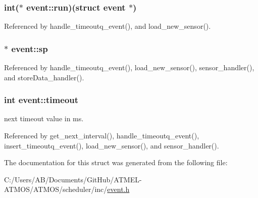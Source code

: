 \hypertarget{structevent_add5b35b1741734964a494b100224aaea}{
\subsubsection[{run}]{\setlength{\rightskip}{0pt plus 5cm}int($\ast$  event\-::run)(struct {\bf event} $\ast$)}}\label{structevent_add5b35b1741734964a494b100224aaea}


Referenced by handle\-\_\-timeoutq\-\_\-event(), and load\-\_\-new\-\_\-sensor().

\hypertarget{structevent_a64304637019072f9322aef7ecf4a7c00}{
\subsubsection[{sp}]{$\ast$ event\-::sp}}\label{structevent_a64304637019072f9322aef7ecf4a7c00}


Referenced by handle\-\_\-timeoutq\-\_\-event(), load\-\_\-new\-\_\-sensor(), sensor\-\_\-handler(), and store\-Data\-\_\-handler().

\hypertarget{structevent_a0da07c7694fd4b1e45c1cb5d65fb962b}{
\subsubsection[{timeout}]{\setlength{\rightskip}{0pt plus 5cm}int event\-::timeout}}\label{structevent_a0da07c7694fd4b1e45c1cb5d65fb962b}


next timeout value in ms. 



Referenced by get\-\_\-next\-\_\-interval(), handle\-\_\-timeoutq\-\_\-event(), insert\-\_\-timeoutq\-\_\-event(), load\-\_\-new\-\_\-sensor(), and sensor\-\_\-handler().



The documentation for this struct was generated from the following file\-:\begin{DoxyCompactItemize}
\item 
C\-:/\-Users/\-A\-B/\-Documents/\-Git\-Hub/\-A\-T\-M\-E\-L-\/\-A\-T\-M\-O\-S/\-A\-T\-M\-O\-S/scheduler/inc/\hyperlink{event_8h}{event.\-h}\end{DoxyCompactItemize}
